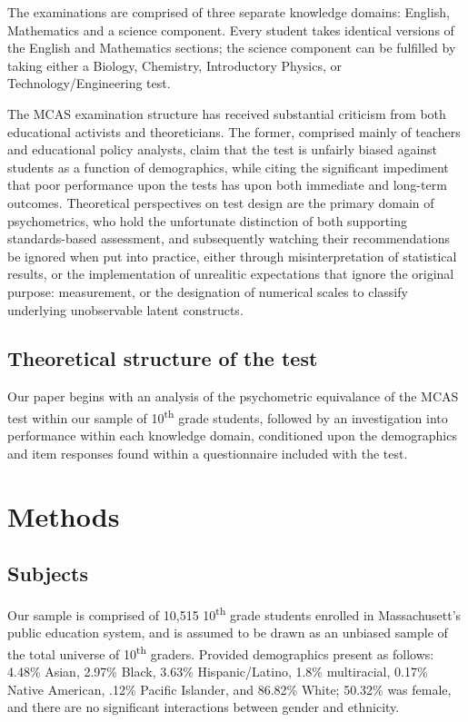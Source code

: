 \documentclass{article}\usepackage[]{graphicx}\usepackage[]{color}
\begin{document}
The examinations are comprised of three separate knowledge domains: English, Mathematics and a science component. Every student takes identical versions of the English and Mathematics sections; the science component can be fulfilled by taking either a Biology, Chemistry, Introductory Physics, or Technology/Engineering test. \cite{mcas_summary}

The MCAS examination structure has received substantial criticism from both educational activists and theoreticians. The former, comprised mainly of teachers and educational policy analysts, claim that the test is unfairly biased against students as a function of demographics, while citing the significant impediment that poor performance upon the tests has upon both immediate and long-term outcomes. \cite{Gaudet} Theoretical perspectives on test design are the primary domain of psychometrics, who hold the unfortunate distinction of both supporting standards-based assessment, and subsequently watching their recommendations be ignored when put into practice, either through misinterpretation of statistical results, or the implementation of unrealitic expectations that ignore the original purpose: measurement, or the designation of numerical scales to classify underlying unobservable latent constructs. 

\subsection{Theoretical structure of the test}
Our paper begins with an analysis of the psychometric equivalance of the MCAS test within our sample of 10\textsuperscript{th} grade students, followed by an investigation into performance within each knowledge domain, conditioned upon the demographics and item responses found within a questionnaire included with the test.

\section{Methods}
\subsection{Subjects}
Our sample is comprised of 10,515 10\textsuperscript{th} grade students enrolled in Massachusett's public education system, and is assumed to be drawn as an unbiased sample of the total universe of 10\textsuperscript{th} graders. Provided demographics present as follows: 4.48\% Asian, 2.97\% Black, 3.63\% Hispanic/Latino, 1.8\% multiracial, 0.17\% Native American, .12\% Pacific Islander, and 86.82\% White; 50.32\% was female, and there are no significant interactions between gender and ethnicity.
\end{document}
